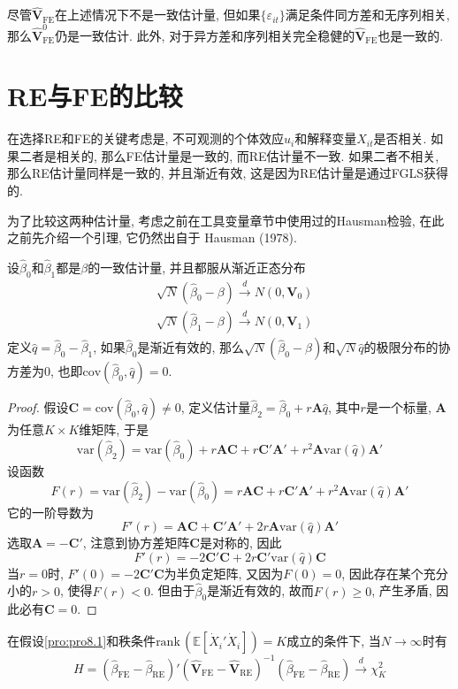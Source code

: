 \documentclass[cn, 12pt, math=mtpro2, bibstyle=apa, blue, twocol]{elegantbook}
\newcommand{\E}{\mathbb{E}}
\newcommand{\var}{\text{var}}
\newcommand{\hb}{\hat{\beta}}
\newcommand{\V}{\mathbold{V}}
\begin{document}
\begin{remark}
尽管$\hat{\V}_{\text{FE}}$在上述情况下不是一致估计量, 但如果$\{\varepsilon_{it}\}$满足条件同方差和无序列相关, 那么$\hat{\V}_{\text{FE}}^0$仍是一致估计. 此外, 对于异方差和序列相关完全稳健的$\hat{\V}_{\text{FE}}$也是一致的.
\end{remark}
\section{RE与FE的比较}
在选择RE和FE的关键考虑是, 不可观测的个体效应$u_i$和解释变量$X_{it}$是否相关. 如果二者是相关的, 那么FE估计量是一致的, 而RE估计量不一致. 如果二者不相关, 那么RE估计量同样是一致的, 并且渐近有效, 这是因为RE估计量是通过FGLS获得的.

为了比较这两种估计量, 考虑之前在工具变量章节中使用过的Hausman检验, 在此之前先介绍一个引理, 它仍然出自于 Hausman (1978).
\begin{lemma}\label{lem:lem8.1}
设$\hb_0$和$\hb_1$都是$\beta$的一致估计量, 并且都服从渐近正态分布
\begin{align*}
&\sqrt{N}(\hb_0-\beta)\xrightarrow{d} N(0,\V_0) \\
&\sqrt{N}(\hb_1-\beta)\xrightarrow{d} N(0,\V_1)
\end{align*}
定义$\hat{q}=\hb_0-\hb_1$, 如果$\hb_0$是渐近有效的, 那么$\sqrt{N}(\hb_0-\beta)$和$\sqrt{N}\hat{q}$的极限分布的协方差为0, 也即$\text{cov}(\hb_0,\hat{q})=0$.
\end{lemma}
\begin{proof}
假设$\mathbold{C}=\text{cov}(\hb_0,\hat{q})\neq0$, 定义估计量$\hb_2=\hb_0+r\mathbold{A}\hat{q}$, 其中$r$是一个标量, $\mathbold{A}$为任意$K\times K$维矩阵, 于是
$$\var(\hb_2)=\var(\hb_0)+r\mathbold{AC}+r\mathbold{C}'\mathbold{A}'+r^2\mathbold{A}\var(\hat{q})\mathbold{A}'$$
设函数
$$F(r)=\var(\hb_2)-\var(\hb_0)=r\mathbold{AC}+r\mathbold{C}'\mathbold{A}'+r^2\mathbold{A}\var(\hat{q})\mathbold{A}'$$
它的一阶导数为
$$F'(r)=\mathbold{AC}+\mathbold{C}'\mathbold{A}'+2r\mathbold{A}\var(\hat{q})\mathbold{A}'$$
选取$\mathbold{A}=-\mathbold{C}'$, 注意到协方差矩阵$\mathbold{C}$是对称的, 因此
$$F'(r)=-2\mathbold{C}'\mathbold{C}+2r\mathbold{C}'\var(\hat{q})\mathbold{C}$$
当$r=0$时, $F'(0)=-2\mathbold{C}'\mathbold{C}$为半负定矩阵, 又因为$F(0)=0$, 因此存在某个充分小的$r>0$, 使得$F(r)<0$. 但由于$\hb_0$是渐近有效的, 故而$F(r)\geq0$, 产生矛盾, 因此必有$\mathbold{C}=0$.
\end{proof}
\begin{theorem}\label{thm:thm8.2}
  在假设\ref{pro:pro8.1}和秩条件$\text{rank}\,(\E[\dot{X}_i'\dot{X}_i])=K$成立的条件下, 当$N\to\infty$时有
  $$H=(\hb_{\text{FE}}-\hb_{\text{RE}})'(\hat{\V}_{\text{FE}}-\hat{\V}_{\text{RE}})^{-1}(\hb_{\text{FE}}-\hb_{\text{RE}})\xrightarrow{d}\chi_{K}^2$$
\end{theorem}
\end{document}
